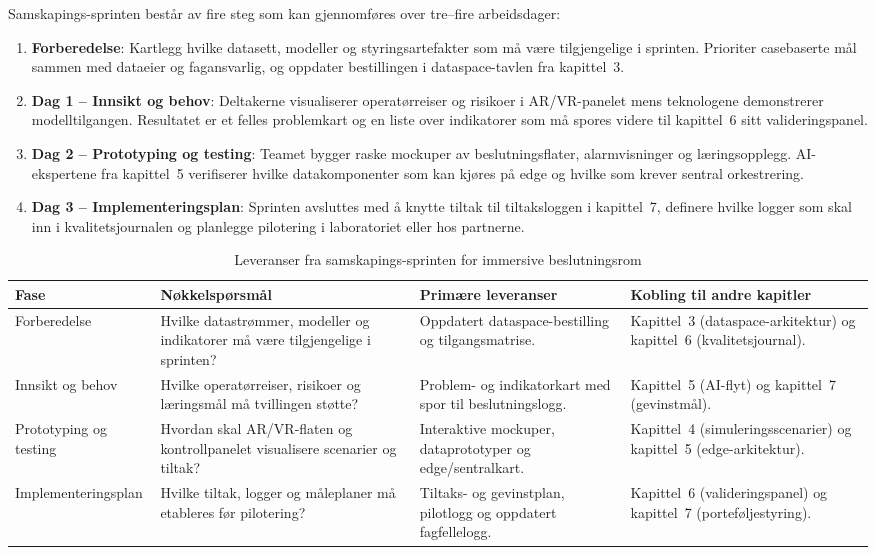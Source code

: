 Samskapings-sprinten består av fire steg som kan gjennomføres over tre–fire arbeidsdager:
\begin{enumerate}
    \item \textbf{Forberedelse}: Kartlegg hvilke datasett, modeller og styringsartefakter som må være tilgjengelige i sprinten. Prioriter casebaserte mål sammen med dataeier og fagansvarlig, og oppdater bestillingen i dataspace-tavlen fra kapittel~3.
    \item \textbf{Dag 1 – Innsikt og behov}: Deltakerne visualiserer operatørreiser og risikoer i AR/VR-panelet mens teknologene demonstrerer modelltilgangen. Resultatet er et felles problemkart og en liste over indikatorer som må spores videre til kapittel~6 sitt valideringspanel.
    \item \textbf{Dag 2 – Prototyping og testing}: Teamet bygger raske mockuper av beslutningsflater, alarmvisninger og læringsopplegg. AI-ekspertene fra kapittel~5 verifiserer hvilke datakomponenter som kan kjøres på edge og hvilke som krever sentral orkestrering.
    \item \textbf{Dag 3 – Implementeringsplan}: Sprinten avsluttes med å knytte tiltak til tiltaksloggen i kapittel~7, definere hvilke logger som skal inn i kvalitetsjournalen og planlegge pilotering i laboratoriet eller hos partnerne.
\end{enumerate}

\begin{table}[htbp]
    \centering
    \caption{Leveranser fra samskapings-sprinten for immersive beslutningsrom}
    \label{tab:kap04-codesign-sprint}
    \begin{tabular}{p{3.2cm}p{4.2cm}p{4.0cm}p{4.0cm}}
        \toprule
        \textbf{Fase} & \textbf{Nøkkelspørsmål} & \textbf{Primære leveranser} & \textbf{Kobling til andre kapitler} \\
        \midrule
        Forberedelse & Hvilke datastrømmer, modeller og indikatorer må være tilgjengelige i sprinten? & Oppdatert dataspace-bestilling og tilgangsmatrise. & Kapittel~3 (dataspace-arkitektur) og kapittel~6 (kvalitetsjournal). \\
        \addlinespace
        Innsikt og behov & Hvilke operatørreiser, risikoer og læringsmål må tvillingen støtte? & Problem- og indikatorkart med spor til beslutningslogg. & Kapittel~5 (AI-flyt) og kapittel~7 (gevinstmål). \\
        \addlinespace
        Prototyping og testing & Hvordan skal AR/VR-flaten og kontrollpanelet visualisere scenarier og tiltak? & Interaktive mockuper, dataprototyper og edge/sentralkart. & Kapittel~4 (simuleringsscenarier) og kapittel~5 (edge-arkitektur). \\
        \addlinespace
        Implementeringsplan & Hvilke tiltak, logger og måleplaner må etableres før pilotering? & Tiltaks- og gevinstplan, pilotlogg og oppdatert fagfellelogg. & Kapittel~6 (valideringspanel) og kapittel~7 (porteføljestyring). \\
        \bottomrule
    \end{tabular}
\end{table}

